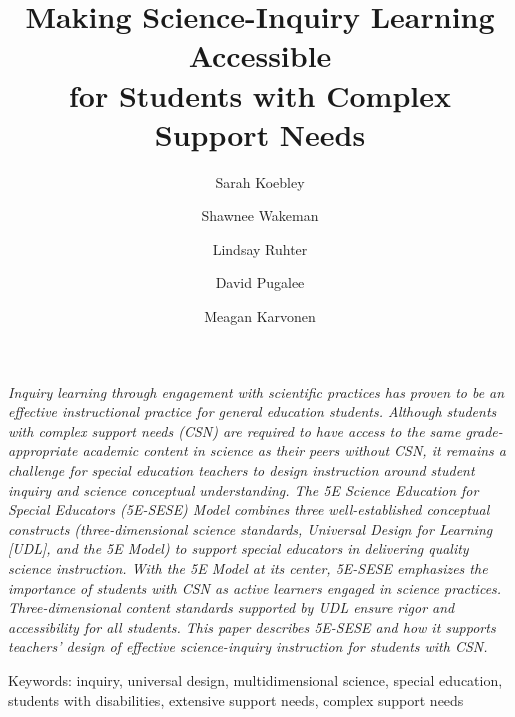 \documentclass[11.5pt]{sig-alternate} %
\makeatletter
\let\oldabstract\abstract
\let\oldendabstract\endabstract
\renewenvironment{abstract} %
{\renewenvironment{quotation}%
               {\list{}{\addtolength{\leftmargin}{1em} %
                        \listparindent 1.5em%
                        \itemindent    \listparindent%
                        \rightmargin   \leftmargin%
                        \parsep        \z@ \@plus\p@}%
                \item\relax}%
               {\endlist}%
\oldabstract}
{\oldendabstract}
\makeatother
\begin{document}
\title{Making Science-Inquiry Learning Accessible \\ for Students with Complex Support Needs}

\author[1]{\large \color{blue} Sarah Koebley} %
\author[2]{\large \color{blue} Shawnee Wakeman}
\author[1]{\large \color{blue} Lindsay Ruhter}
\author[2]{\large \color{blue} David Pugalee}
\author[1]{\large \color{blue} Meagan Karvonen}

\toappear{} %

\maketitle %
\begin{@twocolumnfalse} 
\begin{abstract}
\item %
\begin{large}
\textit{Inquiry learning through engagement with scientific practices has proven to be an effective instructional practice for general education students. Although students with complex support needs (CSN) are required to have access to the same grade-appropriate academic content in science as their peers without CSN, it remains a challenge for special education teachers to design instruction around student inquiry and science conceptual understanding. The 5E Science Education for Special Educators (5E-SESE) Model combines three well-established conceptual constructs (three-dimensional science standards, Universal Design for Learning [UDL], and the 5E Model) to support special educators in delivering quality science instruction. With the 5E Model at its center, 5E-SESE emphasizes the importance of students with CSN as active learners engaged in science practices. Three-dimensional content standards supported by UDL ensure rigor and accessibility for all students. This paper describes 5E-SESE and how it supports teachers’ design of effective science-inquiry instruction for students with CSN.}
\item Keywords: inquiry, universal design, multidimensional science, special education, students with disabilities, extensive support needs, complex support needs

\end{large}     
\end{abstract}
\end{@twocolumnfalse}
\end{document}
